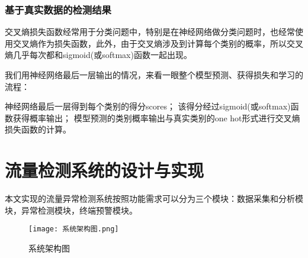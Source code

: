 
\subsection{基于真实数据的检测结果}
交叉熵损失函数经常用于分类问题中，特别是在神经网络做分类问题时，也经常使用交叉熵作为损失函数，此外，由于交叉熵涉及到计算每个类别的概率，所以交叉熵几乎每次都和sigmoid(或softmax)函数一起出现。

我们用神经网络最后一层输出的情况，来看一眼整个模型预测、获得损失和学习的流程：

神经网络最后一层得到每个类别的得分scores；
该得分经过sigmoid(或softmax)函数获得概率输出；
模型预测的类别概率输出与真实类别的one hot形式进行交叉熵损失函数的计算。

\chapter{流量检测系统的设计与实现}
本文实现的流量异常检测系统按照功能需求可以分为三个模块：数据采集和分析模块，异常检测模块，终端预警模块。

\begin{figure}
    \centering
    \texttt{[image: 系统架构图.png]}
    \caption{系统架构图}
    \label{fig:arch}
  \end{figure}

